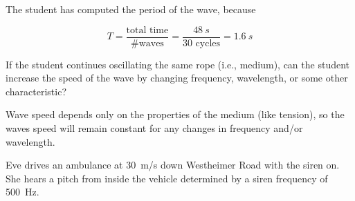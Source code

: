 \documentclass[answers]{exam}
\begin{document}
\begin{questions}
\begin{solutionorbox}
The student has computed the period of the wave, because 

\begin{equation*}
    T = \frac{\text{total time}}{\text{\# waves}} = \frac{\SI{48}{s}}{\text{30 cycles}} = \SI{1.6}{s}
\end{equation*}
\end{solutionorbox}

\fillwithlines{14mm}


\question \label{Q4}
If the student continues oscillating the same rope (i.e., medium), can the student increase the speed of the wave by changing frequency, wavelength, or some other characteristic?

\ifprintanswers
{\color{red}
Wave speed depends only on the properties of the medium (like tension), so the waves speed will remain constant for any changes in frequency and/or wavelength. 
}
\fi

\fillwithlines{1.4cm}


\question
Eve drives an ambulance at \SI{30}{m/s} down Westheimer Road with the siren on. She hears a pitch from inside the vehicle determined by a siren frequency of \SI{500}{Hz}. 

\begin{center}
\end{center}

\end{questions}
\end{document}
